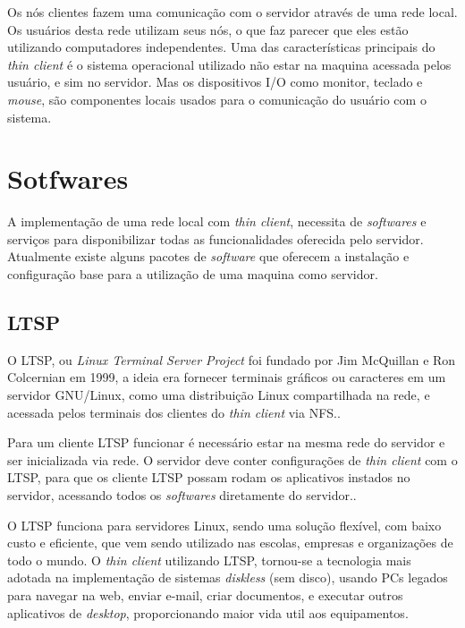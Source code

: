 \documentclass[
	12pt,				%
	openright,			%
	twoside,			%
	a4paper,			%
	chapter=TITLE,		%
	english,			%
	brazil				%
	]{abntex2}
\begin{document}
Os nós clientes fazem uma comunicação com o servidor através de uma rede local. Os usuários desta rede utilizam seus nós, o que faz parecer que eles estão utilizando computadores independentes.\cite{ComoFuncionaThinClient} Uma das características principais do \textit{thin client} é o sistema operacional utilizado não estar na maquina acessada pelos usuário, e sim no servidor. Mas os dispositivos I/O como monitor, teclado e \textit{mouse}, são componentes locais usados para o comunicação do usuário com o sistema.\cite{richards2007linux}


\section{Sotfwares}

A implementação de uma rede local com \textit{thin client}, necessita de \textit{softwares} e serviços para  disponibilizar todas as funcionalidades oferecida pelo servidor. Atualmente existe alguns pacotes de \textit{software} que oferecem a instalação e configuração base para a utilização de uma maquina como servidor.


\subsection{LTSP}

O LTSP, ou \textit{Linux Terminal Server Project} foi fundado por Jim McQuillan e Ron Colcernian em 1999, a ideia era fornecer terminais gráficos ou caracteres em um servidor GNU/Linux, como uma distribuição Linux compartilhada na rede, e acessada pelos terminais dos clientes do \textit{thin client} via NFS.\cite{piaui}. 

Para um cliente LTSP funcionar é necessário estar na mesma rede do servidor e ser inicializada via rede. O servidor deve conter configurações de \textit{thin client} com o LTSP, para que os cliente LTSP possam rodam os aplicativos instados no servidor, acessando todos os \textit{softwares} diretamente do servidor.\cite{piaui}.

O LTSP funciona para servidores Linux, sendo uma solução flexível, com baixo custo e eficiente, que vem sendo utilizado nas escolas, empresas e organizações de todo o mundo. O \textit{thin client} utilizando LTSP, tornou-se a tecnologia mais adotada na implementação de sistemas \textit{diskless} (sem disco), usando PCs legados para navegar na web, enviar e-mail, criar documentos, e executar outros aplicativos de \textit{desktop}, proporcionando maior vida util aos equipamentos.\cite{piaui,ltsp}
\end{document}

